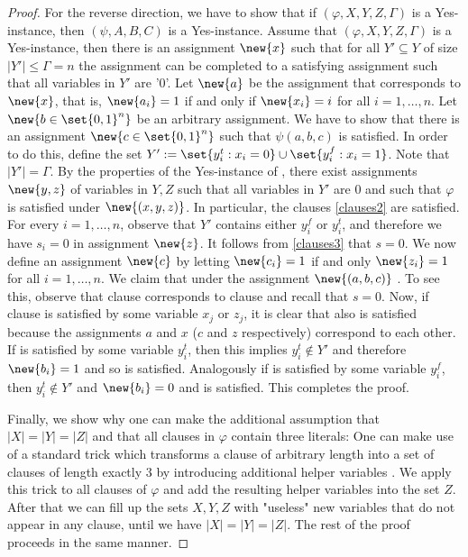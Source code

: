 \documentclass[a4paper,abstracton]{scrartcl}
\begin{document}
\begin{proof}
For the reverse direction, we have to show that if $(\varphi,X,Y,Z,\Gamma)$ is a Yes-instance, then $(\psi,A,B,C)$ is a Yes-instance. 
Assume that $(\varphi,X,Y,Z,\Gamma)$ is a Yes-instance, then there is an assignment $\new{x}$ such that for all $Y' \subseteq Y$ of size $|Y'| \leq \Gamma = n$ the assignment can be completed to a satisfying assignment such that all variables in $Y'$ are '0'.
Let $\new{a}$ be the assignment that corresponds to $\new{x}$, that is, $\new{a_i} = 1$ if and only if $\new{x_i} = i$ for all $i=1,\dots,n$.
 Let $\new{b \in \set{0,1}^n}$ be an arbitrary assignment. 
 We have to show that there is an assignment $\new{c \in \set{0,1}^n}$ such that $\psi(a,b,c)$ is satisfied. 
 In order to do this, define the set $Y' := \set{y_i^t : x_i = 0} \cup \set{y_i^f : x_i = 1}$. 
 Note that $|Y'| = \Gamma$. By the properties of the Yes-instance of {\radj}, there exist assignments $\new{y,z}$ of variables in $Y,Z$ such that all variables in $Y'$ are 0 and such that $\varphi$ is satisfied under $\new{(x,y,z)}$. 
 In particular, the clauses \eqref{clauses2} are satisfied. For every $i=1,\dots,n$, observe that $Y'$ contains either $y_i^f$ or $y_i^t$, and therefore we have $s_i=0$ in assignment $\new{z}$. 
 It follows from \eqref{clauses3} that $s=0$. 
 We now define an assignment $\new{c}$ by letting $\new{c_i} = 1$ if and only $\new{z_i} = 1$ for all $i=1,\dots,n$. 
 We claim that under the assignment $\new{(a,b,c)}$ .
 To see this, observe that clause  corresponds to clause  and recall that $s=0$.
 Now, if clause  is satisfied by some variable $x_j$ or $z_j$, it is clear that also  is satisfied because the assignments $a$ and $x$ ($c$ and $z$ respectively) correspond to each other.
 If  is satisfied by some variable $y^t_i$, then this implies $y^t_i \not\in Y'$ and therefore $\new{b_i}=1$ and so  is satisfied.
  Analogously if  is satisfied by some variable $y^f_i$, then $y^t_i \not\in Y'$ and $\new{b_i}=0$ and  is satisfied.
  This completes the proof.
  
Finally, we show why one can make the additional assumption that $|X|=|Y|=|Z|$ and that all clauses in $\varphi$ contain three literals: One can make use of a standard trick which transforms a clause of arbitrary length into a set of clauses of length exactly 3 by introducing additional helper variables \cite{garey1979computers}.
We apply this trick to all clauses of $\varphi$ and add the resulting helper variables into the set $Z$. After that we can fill up the sets $X,Y,Z$ with "useless" new variables that do not appear in any clause, until we have $|X| = |Y| = |Z|$. The rest of the proof proceeds in the same manner.
\end{proof}
\end{document}
